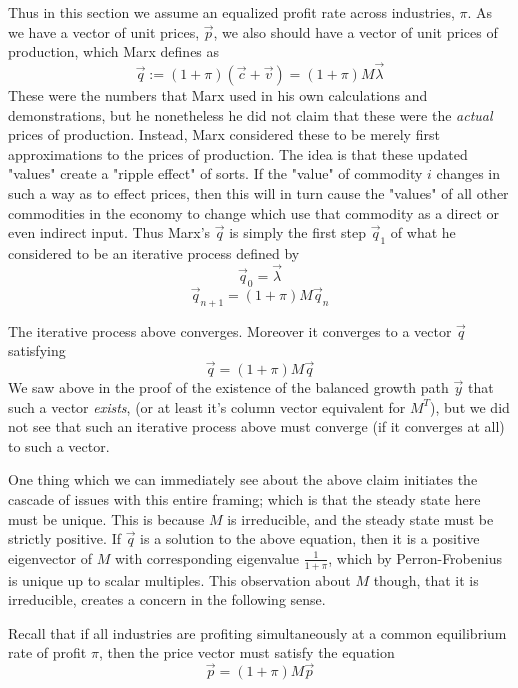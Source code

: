 Thus in this section we assume an equalized profit rate across industries, $\pi$. As we have a vector of unit prices, $\vec{p}$, we also should have a vector of unit prices of production, which Marx defines as 
\[ \vec{q} := (1+\pi)(\vec{c} + \vec{v}) = (1+\pi)M\vec{\lambda} \]
These were the numbers that Marx used in his own calculations and demonstrations, but he nonetheless he did not claim that these were the \textit{actual} prices of production. Instead, Marx considered these to be merely first approximations to the prices of production. The idea is that these updated "values" create a "ripple effect" of sorts. If the "value" of commodity $i$ changes in such a way as to effect prices, then this will in turn cause the "values" of all other commodities in the economy to change which use that commodity as a direct or even indirect input. Thus Marx's $\vec{q}$ is simply the first step $\vec{q}_1$ of what he considered to be an iterative process defined by
\[  \vec{q}_0 = \vec{\lambda} \]
\[ \vec{q}_{n+1} = (1+\pi)M\vec{q}_n \]
\begin{claim}
	The iterative process above converges. Moreover it converges to a vector $\vec{q}$ satisfying
	\[ \vec{q} = (1+\pi)M\vec{q} \]
	We saw above in the proof of the existence of the balanced growth path $\vec{y}$ that such a vector \emph{exists}, (or at least it's column vector equivalent for $M^T$), but we did not see that such an iterative process above must converge (if it converges at all) to such a vector. 
\end{claim} 
One thing which we can immediately see about the above claim initiates the cascade of issues with this entire framing; which is that the steady state here must be unique. This is because $M$ is irreducible, and the steady state must be strictly positive. If $\vec{q}$ is a solution to the above equation, then it is a positive eigenvector of $M$ with corresponding eigenvalue $\frac{1}{1+\pi}$, which by Perron-Frobenius is unique up to scalar multiples. This observation about $M$ though, that it is irreducible, creates a concern in the following sense. \par 
Recall that if all industries are profiting simultaneously at a common equilibrium rate of profit $\pi$, then the price vector must satisfy the equation 
	\[ \vec{p} = (1+\pi)M\vec{p}  \]

